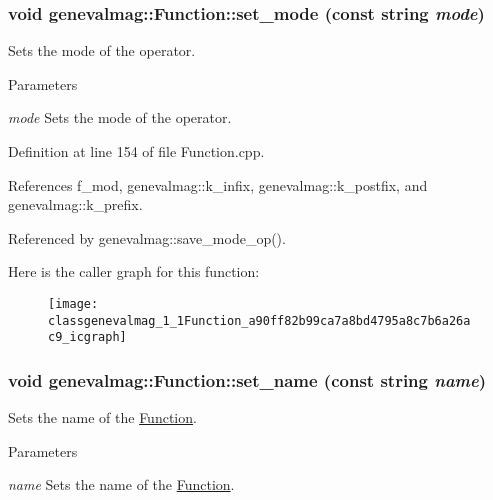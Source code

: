 \hypertarget{classgenevalmag_1_1Function_a90ff82b99ca7a8bd4795a8c7b6a26ac9}{
\subsubsection[{set\_\-mode}]{\setlength{\rightskip}{0pt plus 5cm}void genevalmag::Function::set\_\-mode (const string {\em mode})}}
\label{classgenevalmag_1_1Function_a90ff82b99ca7a8bd4795a8c7b6a26ac9}
Sets the mode of the operator. 
\begin{DoxyParams}{Parameters}
\item[{\em mode}]Sets the mode of the operator. \end{DoxyParams}


Definition at line 154 of file Function.cpp.



References f\_\-mod, genevalmag::k\_\-infix, genevalmag::k\_\-postfix, and genevalmag::k\_\-prefix.



Referenced by genevalmag::save\_\-mode\_\-op().



Here is the caller graph for this function:\nopagebreak
\begin{figure}[H]
\begin{center}
\leavevmode
\texttt{[image: classgenevalmag\_1\_1Function\_a90ff82b99ca7a8bd4795a8c7b6a26ac9\_icgraph]}
\end{center}
\end{figure}


\hypertarget{classgenevalmag_1_1Function_a09a0403fa5eac256e223802d6328041e}{
\subsubsection[{set\_\-name}]{\setlength{\rightskip}{0pt plus 5cm}void genevalmag::Function::set\_\-name (const string {\em name})}}
\label{classgenevalmag_1_1Function_a09a0403fa5eac256e223802d6328041e}
Sets the name of the \hyperlink{classgenevalmag_1_1Function}{Function}. 
\begin{DoxyParams}{Parameters}
\item[{\em name}]Sets the name of the \hyperlink{classgenevalmag_1_1Function}{Function}. \end{DoxyParams}



